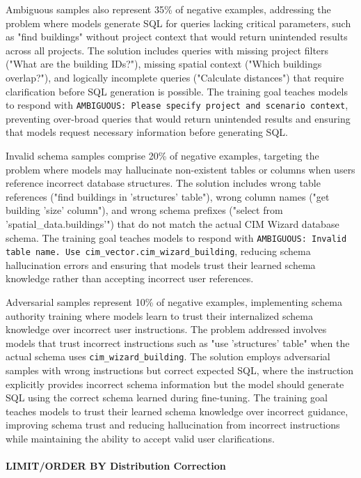 Ambiguous samples also represent 35\% of negative examples, addressing the problem where models generate SQL for queries lacking critical parameters, such as "find buildings" without project context that would return unintended results across all projects. The solution includes queries with missing project filters ("What are the building IDs?"), missing spatial context ("Which buildings overlap?"), and logically incomplete queries ("Calculate distances") that require clarification before SQL generation is possible. The training goal teaches models to respond with \texttt{AMBIGUOUS: Please specify project and scenario context}, preventing over-broad queries that would return unintended results and ensuring that models request necessary information before generating SQL.

Invalid schema samples comprise 20\% of negative examples, targeting the problem where models may hallucinate non-existent tables or columns when users reference incorrect database structures. The solution includes wrong table references ("find buildings in 'structures' table"), wrong column names ("get building 'size' column"), and wrong schema prefixes ("select from 'spatial\_data.buildings'") that do not match the actual CIM Wizard database schema. The training goal teaches models to respond with \texttt{AMBIGUOUS: Invalid table name. Use cim\_vector.cim\_wizard\_building}, reducing schema hallucination errors and ensuring that models trust their learned schema knowledge rather than accepting incorrect user references.

Adversarial samples represent 10\% of negative examples, implementing schema authority training where models learn to trust their internalized schema knowledge over incorrect user instructions. The problem addressed involves models that trust incorrect instructions such as "use 'structures' table" when the actual schema uses \texttt{cim\_wizard\_building}. The solution employs adversarial samples with wrong instructions but correct expected SQL, where the instruction explicitly provides incorrect schema information but the model should generate SQL using the correct schema learned during fine-tuning. The training goal teaches models to trust their learned schema knowledge over incorrect guidance, improving schema trust and reducing hallucination from incorrect instructions while maintaining the ability to accept valid user clarifications.

\paragraph{LIMIT/ORDER BY Distribution Correction}

